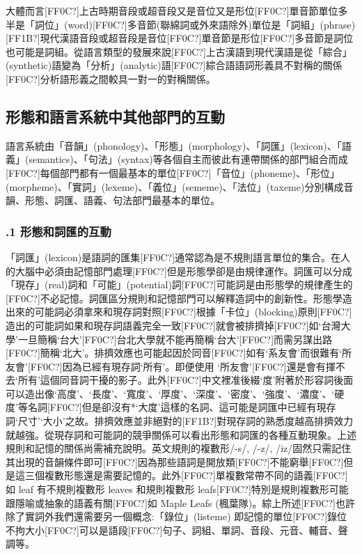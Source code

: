 \textrm{大體而言[FF0C?]上古時期音段或超音段又是音位又是形位[FF0C?]單音節單位多半是「詞位」(word)}[FF0C?]\textrm{多音節(聯綿詞或外來語除外)單位是「詞組」(phrase)}[FF1B?]\textrm{現代漢語音段或超音段是音位[FF0C?]單音節是形位[FF0C?]多音節是詞位也可能是詞組。從語言類型的發展來說[FF0C?]上古漢語到現代漢語是從「綜合」(synthetic)語變為「分析」(analytic)語[FF0C?]綜合語語詞形義具不對稱的關係[FF0C?]分析語形義之間較具一對一的對稱關係。}

\subsection{ 形態和語言系統中其他部門的互動}

\textrm{語言系統由「音韻」(phonology)}、\textrm{「形態」(morphology)}、\textrm{「詞匯」(lexicon)}、\textrm{「語義」(semantics)}、\textrm{「句法」(syntax)等各個自主而彼此有連帶關係的部門組合而成[FF0C?]每個部門都有一個最基本的單位[FF0C?]「音位」(phoneme)}、\textrm{「形位」(morpheme)}、\textrm{「實詞」(lexeme)}、\textrm{「義位」(sememe)}、\textrm{「法位」(taxeme)分別構成音韻}、\textrm{形態}、\textrm{詞匯、語義、句法部門最基本的單位。}

\subsubsection{.1 形態和詞匯的互動}

\textrm{「詞匯」(lexicon)是語詞的匯集[FF0C?]通常認為是不規則語言單位的集合。在人的大腦中必須由記憶部門處理[FF0C?]但是形態學卻是由規律運作。詞匯可以分成「現存」(real)詞和「可能」(potential)詞[FF0C?]可能詞是由形態學的規律產生的[FF0C?]不必記憶。詞匯區分規則和記憶部門可以解釋造詞中的創新性。形態學造出來的可能詞必須拿來和現存詞對照[FF0C?]根據「卡位」(blocking)原則[FF0C?]造出的可能詞如果和現存詞語義完全一致[FF0C?]就會被排擠掉[FF0C?]如‘台灣大學’一旦簡稱‘台大’}[FF0C?]\textrm{台北大學就不能再簡稱‘台大’}[FF0C?]\textrm{而需另謀出路[FF0C?]簡稱‘北大’}。\textrm{排擠效應也可能起因於同音[FF0C?]如有‘系友會’而很難有‘所友會’}[FF0C?]\textrm{因為已經有現存詞‘所有’}。\textrm{即便使用 ‘所友會’}[FF0C?]\textrm{還是會有揮不去‘所有’這個同音詞干擾的影子。此外[FF0C?]中文裡准後綴‘度’附著於形容詞後面可以造出像‘高度’}、\textrm{‘長度’}、\textrm{‘寬度’}、\textrm{‘厚度’}、\textrm{‘深度’}、\textrm{‘密度’}、\textrm{‘強度’}、\textrm{‘濃度’}、\textrm{‘硬度’等名詞[FF0C?]但是卻沒有*‘大度’這樣的名詞、這可能是詞匯中已經有現存詞‘尺寸’‘大小’之故。排擠效應並非絕對的[FF1B?]對現存詞的熟悉度越高排擠效力就越強。從現存詞和可能詞的競爭關係可以看出形態和詞匯的各種互動現象。上述規則和記憶的關係尚需補充說明。英文規則的複數形/-s/, /-z/, /iz/固然只需記住其出現的音韻條件即可[FF0C?]因為那些語詞是開放類[FF0C?]不能窮舉[FF0C?]但是這三個複數形態還是需要記憶的。此外[FF0C?]單複數常帶不同的語義[FF0C?]如 leaf 有不規則複數形 leaves 和規則複數形 leafs}[FF0C?]\textrm{特別是規則複數形可能跟隱喻或抽象的語義有關[FF0C?]如 Maple Leafs (楓葉隊)。綜上所述[FF0C?]也許除了實詞外我們還需要另一個概念:「錄位」(listeme) 即記憶的單位[FF0C?]錄位不拘大小[FF0C?]可以是語段[FF0C?]句子、詞組、單詞、音段、元音、輔音、聲調等。}

